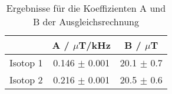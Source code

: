 \begin{table}
  \label{tab:isoFit}
  \centering
\begin{tabular}{ccc} \toprule
 & A / $\mu$T/kHz  & B / $\mu$T \\ \midrule
Isotop 1 & 0.146 $\pm$ 0.001 & 20.1 $\pm$ 0.7 \\
Isotop 2 & 0.216 $\pm$ 0.001 & 20.5 $\pm$ 0.6 \\
\bottomrule
\end{tabular}
\caption{Ergebnisse für die Koeffizienten A und B der Ausgleichsrechnung}
\end{table}